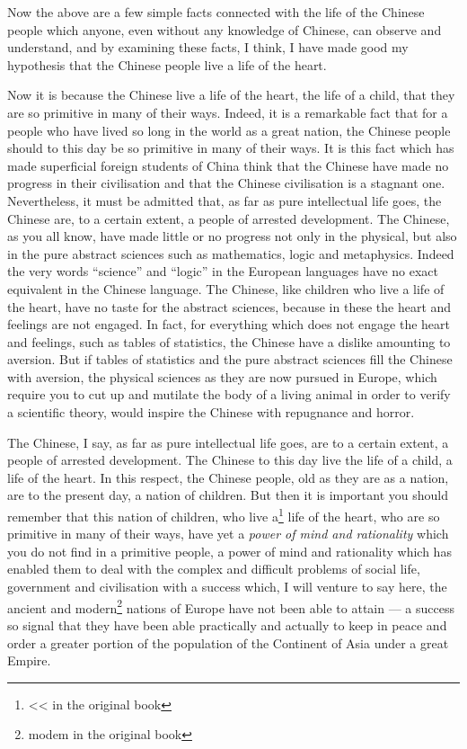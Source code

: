 Now the above are a few simple facts connected with the life of the Chinese people which anyone, even without any knowledge of Chinese, can observe and understand, and by examining these facts, I think, I have made good my hypothesis that the Chinese people live a life of the heart.

\vspace{0.5cm}
Now it is because the Chinese live a life of the heart, the life of a child, that they are so primitive in many of their ways.
Indeed, it is a remarkable fact that for a people who have lived so long in the world as a great nation, the Chinese people should to this day be so primitive in many of their ways.
It is this fact which has made superficial foreign students of China think that the Chinese have made no progress in their civilisation and that the Chinese civilisation is a stagnant one.
Nevertheless, it must be admitted that, as far as pure intellectual life goes, the Chinese are, to a certain extent, a people of arrested development.
The Chinese, as you all know, have made little or no progress not only in the physical, but also in the pure abstract sciences such as mathematics, logic and metaphysics.
Indeed the very words ``science'' and ``logic'' in the European languages have no exact equivalent in the Chinese language.
The Chinese, like children who live a life of the heart, have no taste for the abstract sciences, because in these the heart and feelings are not engaged.
In fact, for everything which does not engage the heart and feelings, such as tables of statistics, the Chinese have a dislike amounting to aversion.
But if tables of statistics and the pure abstract sciences fill the Chinese with aversion, the physical sciences as they are now pursued in Europe, which require you to cut up and mutilate the body of a living animal in order to verify a scientific theory, would inspire the Chinese with repugnance and horror.

The Chinese, I say, as far as pure intellectual life goes, are to a certain extent, a people of arrested development.
The Chinese to this day live the life of a child, a life of the heart.
In this respect, the Chinese people, old as they are as a nation, are to the present day, a nation of children.
But then it is important you should remember that this nation of children, who live a\footnote{<< in the original book} life of the heart, who are so primitive in many of their ways, have yet a \emph{power of mind and rationality} which you do not find in a primitive people, a power of mind and rationality which has enabled them to deal with the complex and difficult problems of social life, government and civilisation with a success which, I will venture to say here, the ancient and modern\footnote{modem in the original book} nations of Europe have not been able to attain --- a success so signal that they have been able practically and actually to keep in peace and order a greater portion of the population of the Continent of Asia under a great Empire.

